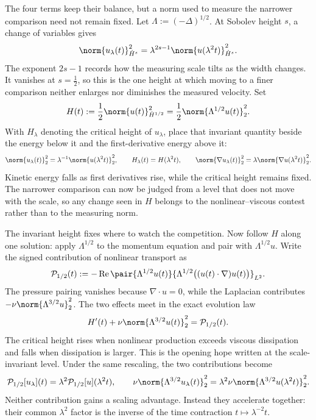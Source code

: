 The four terms keep their balance, but a norm used to measure the narrower comparison need not remain fixed.
Let \(\Lambda:=(-\Delta)^{1/2}\).
At Sobolev height \(s\), a change of variables gives
\[
  \norm{u_\lambda(t)}_{\dot H^s}^2
  =
  \lambda^{2s-1}
  \norm{u(\lambda^2t)}_{\dot H^s}^2.
\]
The exponent \(2s-1\) records how the measuring scale tilts as the width changes.
It vanishes at \(s=\tfrac12\), so this is the one height at which moving to a finer comparison neither enlarges nor diminishes the measured velocity.
Set
\[
  H(t)
  :=
  \frac12\norm{u(t)}_{\dot H^{1/2}}^2
  =
  \frac12\norm{\Lambda^{1/2}u(t)}_2^2.
\]
With \(H_\lambda\) denoting the critical height of \(u_\lambda\), place that invariant quantity beside the energy below it and the first-derivative energy above it:
\[
  \norm{u_\lambda(t)}_2^2
  =
  \lambda^{-1}\norm{u(\lambda^2t)}_2^2,
  \qquad
  H_\lambda(t)=H(\lambda^2t),
  \qquad
  \norm{\nabla u_\lambda(t)}_2^2
  =
  \lambda\norm{\nabla u(\lambda^2t)}_2^2.
\]
Kinetic energy falls as first derivatives rise, while the critical height remains fixed.
The narrower comparison can now be judged from a level that does not move with the scale, so any change seen in \(H\) belongs to the nonlinear--viscous contest rather than to the measuring norm.


The invariant height fixes where to watch the competition.
Now follow \(H\) along one solution: apply \(\Lambda^{1/2}\) to the momentum equation and pair with \(\Lambda^{1/2}u\).
Write the signed contribution of nonlinear transport as
\[
  \mathcal P_{1/2}(t)
  :=
  -\operatorname{Re}
  \pair
    {\Lambda^{1/2}u(t)}
    {\Lambda^{1/2}\bigl((u(t)\cdot\nabla)u(t)\bigr)}_{L^2}.
\]
The pressure pairing vanishes because \(\nabla\cdot u=0\), while the Laplacian contributes \(-\nu\norm{\Lambda^{3/2}u}_2^2\).
The two effects meet in the exact evolution law
\[
  H'(t)
  +
  \nu\norm{\Lambda^{3/2}u(t)}_2^2
  =
  \mathcal P_{1/2}(t).
\]
The critical height rises when nonlinear production exceeds viscous dissipation and falls when dissipation is larger.
This is the opening hope written at the scale-invariant level.
Under the same rescaling, the two contributions become
\[
  \mathcal P_{1/2}[u_\lambda](t)
  =
  \lambda^2\mathcal P_{1/2}[u](\lambda^2t),
  \qquad
  \nu\norm{\Lambda^{3/2}u_\lambda(t)}_2^2
  =
  \lambda^2\nu\norm{\Lambda^{3/2}u(\lambda^2t)}_2^2.
\]
Neither contribution gains a scaling advantage.
Instead they accelerate together: their common \(\lambda^2\) factor is the inverse of the time contraction \(t\mapsto\lambda^{-2}t\).

